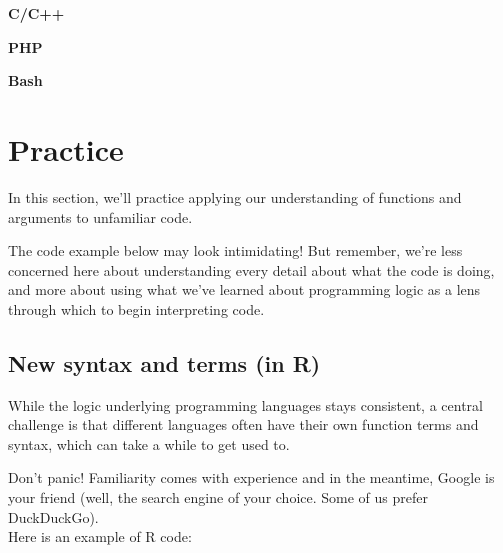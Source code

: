 \documentclass[
]{book}
\newenvironment{Shaded}{\begin{snugshade}}{\end{snugshade}}
\begin{document}
\textbf{C/C++}

\begin{Shaded}
\begin{Highlighting}[]

\end{Highlighting}
\end{Shaded}

\textbf{PHP}

\begin{Shaded}
\begin{Highlighting}[]

\end{Highlighting}
\end{Shaded}

\textbf{Bash}

\begin{Shaded}
\begin{Highlighting}[]

\end{Highlighting}
\end{Shaded}

\chapter{Practice}\label{practice-1}

In this section, we'll practice applying our understanding of functions and arguments to unfamiliar code.

The code example below may look intimidating! But remember, we're less concerned here about understanding every detail about what the code is doing, and more about using what we've learned about programming logic as a lens through which to begin interpreting code.

\section{New syntax and terms (in R)}\label{new-syntax-and-terms-in-r}

While the logic underlying programming languages stays consistent, a central challenge is that different languages often have their own function terms and syntax, which can take a while to get used to.

Don't panic! Familiarity comes with experience and in the meantime, Google is your friend (well, the search engine of your choice. Some of us prefer DuckDuckGo).\\

Here is an example of R code:
\end{document}
